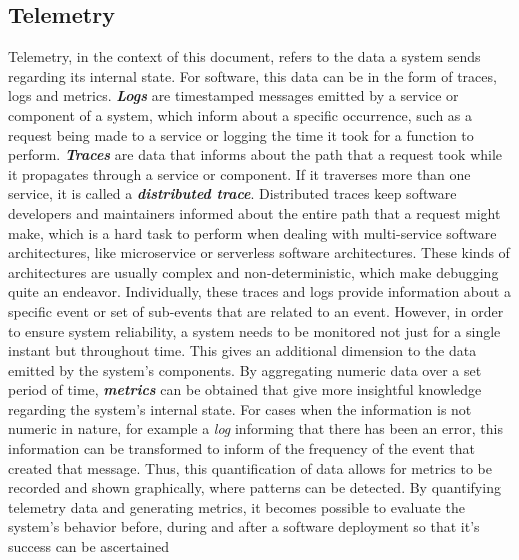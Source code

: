 \subsection{Telemetry}\label{state-of-the-art:ss:telemetry}

Telemetry, in the context of this document, refers to the data a system sends regarding its internal state. For software, this data can be in the form of traces, logs and metrics.
\textbf{\textit{Logs}} are timestamped messages emitted by a service or component of a system, which inform about a specific occurrence, such as a request being made to a service or logging the time it took for a function to perform.
\textbf{\textit{Traces}} are data that informs about the path that a request took while it propagates through a service or component. If it traverses more than one service, it is called a \textbf{\textit{distributed trace}}. Distributed traces keep software developers and maintainers informed about the entire path that a request might make, which is a hard task to perform when dealing with multi-service software architectures, like microservice or serverless software architectures. These kinds of architectures are usually complex and non-deterministic, which make debugging quite an endeavor. Individually, these traces and logs provide information about a specific event or set of sub-events that are related to an event. However, in order to ensure system reliability, a system needs to be monitored not just for a single instant but throughout time. This gives an additional dimension to the data emitted by the system's components. By aggregating numeric data over a set period of time, \textbf{\textit{metrics}} can be obtained that give more insightful knowledge regarding the system's internal state. For cases when the information is not numeric in nature, for example a \textit{log} informing that there has been an error, this information can be transformed to inform of the frequency of the event that created that message. Thus, this quantification of data allows for metrics to be recorded and shown graphically, where patterns can be detected. By quantifying telemetry data and generating metrics, it becomes possible to evaluate the system's behavior before, during and after a software deployment so that it's success can be ascertained \Parencite{mills1988software}
